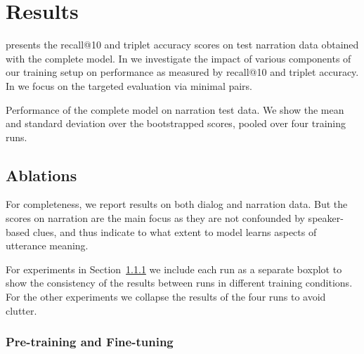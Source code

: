 \section{Results}

 presents the recall@10 and triplet accuracy
scores on test narration data obtained with the complete model.  In
 we investigate the impact of various components
of our training setup on performance as measured by recall@10 and
triplet accuracy.  In  we focus on the
targeted evaluation via minimal pairs.  

\label{sec:results}
\begin{table}[htb]
  
  \caption{Performance of the complete model on narration test
  	data. We show the mean and standard deviation over the
  	bootstrapped scores, pooled over four training runs.}
  \label{tab:test_scores}
\end{table}


\subsection{Ablations}
\label{sec:ablations}
For completeness, we report results on both dialog and narration
data. But the scores on narration are the main focus as they are
not confounded by speaker-based clues, and thus indicate to what
extent to model learns aspects of utterance meaning.

For experiments in Section~\ref{sec:pretraining} we include each run as a separate boxplot
to show the consistency of the results between runs in
different training conditions.  For the other experiments we collapse
the results of the four runs to avoid clutter.

\subsubsection{Pre-training and Fine-tuning}
\label{sec:pretraining}

